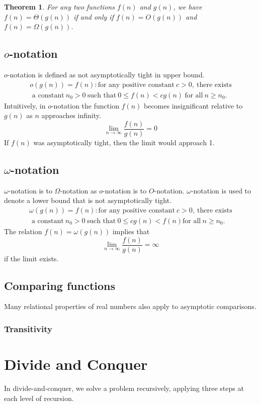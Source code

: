 \documentclass[]{book}
\newtheorem{theorem}{Theorem}[chapter]
\begin{document}
    \begin{theorem}
      For any two functions $f(n)$ and $g(n)$, we have $f(n) = \Theta(g(n))$
      if and only if $f(n) = O(g(n))$ and $f(n) = \Omega(g(n))$.
    \end{theorem}

    \section{$o$-notation}
      $o$-notation is defined as not asymptotically tight in upper bound.
      \begin{multline*}
        o(g(n)) = f(n): \text{for any positive constant}\ c > 0,\ \text{there exists}\\\text{ a constant}\
        n_0 > 0\ \text{such that}\ 0 \leq f(n) < cg(n)\ \text{for all}\ n \geq n_0.
      \end{multline*}
      Intuitively, in $o$-notation the function $f(n)$ becomes insignificant relative
      to $g(n)$ as $n$ approaches infinity.
      $$\lim_{n\to\infty} \dfrac{f(n)}{g(n)} = 0$$
      If $f(n)$ was asymptotically tight, then the limit would approach 1.

    \section{$\omega$-notation}
      $\omega$-notation is to $\Omega$-notation as $o$-notation is to $O$-notation. $\omega$-notation
      is used to denote a lower bound that is not asymptotically tight.
      \begin{multline*}
        \omega(g(n)) = f(n): \text{for any positive constant}\ c > 0,\ \text{there exists}\\\text{ a constant}\
        n_0 > 0\ \text{such that}\ 0 \leq cg(n) < f(n) \text{for all}\ n \geq n_0.
      \end{multline*}
      The relation $f(n) = \omega(g(n))$ implies that $$\lim_{n\to\infty} \dfrac{f(n)}{g(n)} = \infty$$
      if the limit exists.

    \section*{Comparing functions}
      Many relational properties of real numbers also apply to asymptotic comparisons.
      \subsection*{Transitivity}
  \chapter{Divide and Conquer}
    In divide-and-conquer, we solve a problem recursively, applying three steps
    at each level of recursion.\\
\end{document}
